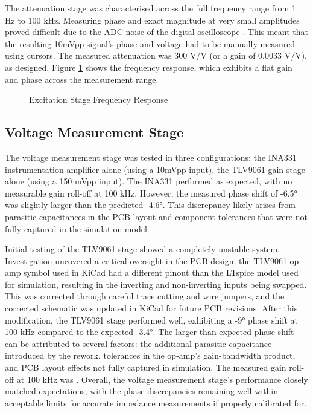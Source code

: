 The attenuation stage was characterised across the full frequency range from 1 Hz to 100 kHz. Measuring phase and exact magnitude at very small amplitudes proved difficult due to the ADC noise of the digital oscilloscope \cite{ImSeeingUnexpected}. This meant that the resulting 10mVpp signal's phase and voltage had to be manually measured using cursors. The measured attenuation was 300 V/V (or a gain of 0.0033 V/V), as designed. Figure \ref{fig:excitation_freq_response} shows the frequency response, which exhibits a flat gain and phase across the measurement range.

\begin{figure}[H]
    \centering
    \caption{Excitation Stage Frequency Response}
    \label{fig:excitation_freq_response}
\end{figure}

\subsection{Voltage Measurement Stage} 
The voltage measurement stage was tested in three configurations: the INA331 instrumentation amplifier alone (using a 10mVpp input), the TLV9061 gain stage alone (using a 150 mVpp input). The INA331 performed as expected, with no measurable gain roll-off at 100 kHz. However, the measured phase shift of -6.5° was slightly larger than the predicted -4.6°. This discrepancy likely arises from parasitic capacitances in the PCB layout and component tolerances that were not fully captured in the simulation model.

Initial testing of the TLV9061 stage showed a completely unstable system. Investigation uncovered a critical oversight in the PCB design: the TLV9061 op-amp symbol used in KiCad had a different pinout than the LTspice model used for simulation, resulting in the inverting and non-inverting inputs being swapped. This was corrected through careful trace cutting and wire jumpers, and the corrected schematic was updated in KiCad for future PCB revisions. After this modification, the TLV9061 stage performed well, exhibiting a -9° phase shift at 100 kHz compared to the expected -3.4°. The larger-than-expected phase shift can be attributed to several factors: the additional parasitic capacitance introduced by the rework, tolerances in the op-amp's gain-bandwidth product, and PCB layout effects not fully captured in simulation. The measured gain roll-off at 100 kHz was . Overall, the voltage measurement stage's performance closely matched expectations, with the phase discrepancies remaining well within acceptable limits for accurate impedance measurements if properly calibrated for.

